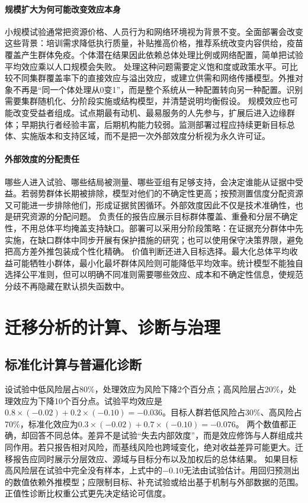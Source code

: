 \paragraph{规模扩大为何可能改变效应本身}

小规模试验通常把资源价格、人员行为和网络环境视为背景不变。全面部署会改变这些背景：培训需求降低执行质量，补贴推高价格，推荐系统改变内容供给，疫苗覆盖产生群体免疫。个体潜在结果因此依赖总体处理比例或网络配置，简单把试验平均效应乘以人口规模会失败。
处理这种问题需要定义饱和度或政策水平。可比较不同集群覆盖率下的直接效应与溢出效应，或建立供需和网络传播模型。外推对象不再是“同一个体处理从0变1”，而是整个系统从一种配置转向另一种配置。识别需要集群随机化、分阶段实施或结构模型，并清楚说明均衡假设。
规模效应也可能改变受益者组成。试点期最有动机、最易服务的人先参与，扩展后进入边缘群体；早期执行者经验丰富，后期机构能力较弱。监测部署过程应持续更新目标总体、实施版本和支持区域，而不是把一次外部效度分析视为永久许可证。

\paragraph{外部效度的分配责任}

哪些人进入试验、哪些结局被测量、哪些亚组有足够支持，会决定谁能从证据中受益。若弱势群体长期被排除，模型对他们的不确定性更高；按预测置信度分配资源又可能进一步排除他们，形成证据贫困循环。外部效度因此不仅是技术准确性，也是研究资源的分配问题。
负责任的报告应展示目标群体覆盖、重叠和分层不确定性，不用总体平均掩盖支持缺口。部署可以采用分阶段策略：在证据充分群体中先实施，在缺口群体中同步开展有保护措施的研究；也可以使用保守决策界限，避免把高方差外推包装成个性化精确。
价值判断还进入目标选择。最大化总体平均收益可能牺牲小群体，最小化最坏群体风险则可能降低平均效率。统计模型不能独自选择公平准则，但可以明确不同准则需要哪些效应、成本和不确定性信息，使规范分歧不再隐藏在默认损失函数中。

\section{迁移分析的计算、诊断与治理}

\subsection{标准化计算与普遍化诊断}

设试验中低风险层占80\%，处理效应为风险下降2个百分点；高风险层占20\%，处理效应为下降10个百分点。试验平均效应是$0.8\times(-0.02)+0.2\times(-0.10)=-0.036$。目标人群若低风险占30\%、高风险占70\%，标准化效应为$0.3\times(-0.02)+0.7\times(-0.10)=-0.076$。
两个数值都正确，却回答不同总体。差异不是试验“失去内部效度”，而是效应修饰与人群组成共同作用。若只报告相对风险，而基线风险也跨域变化，绝对收益差异可能更大。迁移报告应同时展示分层效应、源域与目标分布以及加权后的总体结果。
如果目标高风险层在试验中完全没有样本，上式中的$-0.10$无法由试验估计。用回归预测出的数值依赖外推模型；应限制目标、补充试验或给出基于机制与外部数据的范围。正值性诊断比权重公式更先决定结论可信度。

